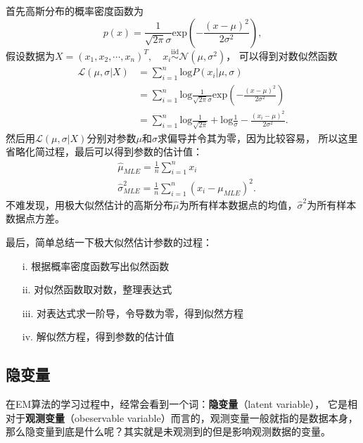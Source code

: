 \documentclass[UTF8]{ctexart}
\begin{document}
首先高斯分布的概率密度函数为
\begin{equation}
  p(x)= \frac{1}{\sqrt{2 \pi} \sigma}\mathrm{exp}\left(-\frac{(x-\mu)^2}{2\sigma^2}\right),
\end{equation}
假设数据为$X = (x_1,x_2, \cdots,x_n)^T, \quad x_i  \overset{\text{iid}}{\sim} \mathcal{N}(\mu,\sigma^2)$，
可以得到对数似然函数
\begin{equation}
  \begin{split}
    \mathcal{L}(\mu,\sigma|X) &= \sum_{i=1}^{n}\mathrm{log}P(x_i|\mu, \sigma)\\
    &= \sum_{i=1}^{n}{\mathrm{log}\frac{1}{\sqrt{2 \pi} \sigma}\mathrm{exp}\left(-\frac{(x-\mu)^2}{2\sigma^2}\right)}\\
    &= \sum_{i=1}^{n}{\mathrm{log}\frac{1}{\sqrt{2\pi}}+\mathrm{log}\frac{1}{\sigma}-\frac{(x_i-\mu)^2}{2\sigma^2}}.
  \end{split}
\end{equation}
然后用$\mathcal{L}(\mu,\sigma|X)$分别对参数$\mu$和$\sigma$求偏导并令其为零，因为比较容易，
所以这里省略化简过程，最后可以得到参数的估计值：
\begin{equation}
  \begin{split}
    &\hat\mu_{MLE} = \frac{1}{n}\sum_{i=1}^{n}x_i\\
    &\hat\sigma_{MLE}^2= \frac{1}{n}\sum_{i=1}^{n}(x_i-\mu_{MLE})^2.
  \end{split}
\end{equation}
不难发现，用极大似然估计的高斯分布$\hat\mu$为所有样本数据点的均值，$\hat\sigma^2$为所有样本数据点方差。

最后，简单总结一下极大似然估计参数的过程：
\begin{itemize}
  \item[i.] 根据概率密度函数写出似然函数
  \item[ii.] 对似然函数取对数，整理表达式
  \item[iii.] 对表达式求一阶导，令导数为零，得到似然方程
  \item[iv.] 解似然方程，得到参数的估计值
\end{itemize}

\subsection{隐变量}
\label{subsection-2}

在EM算法的学习过程中，经常会看到一个词：\textbf{隐变量}（latent variable），
它是相对于\textbf{观测变量}（obeservable variable）而言的，观测变量一般就指的是数据本身，
那么隐变量到底是什么呢？其实就是未观测到的但是影响观测数据的变量。
\end{document}
